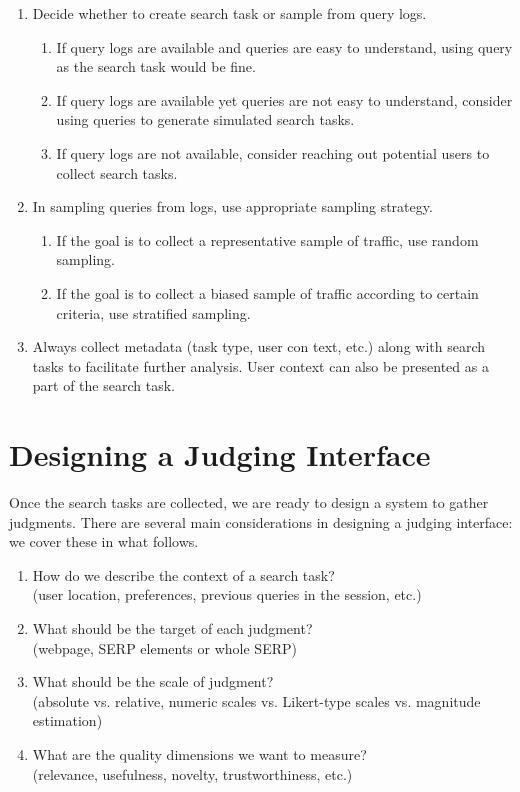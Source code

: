 \begin{enumerate}
	\item Decide whether to create search task or sample from query logs. 
	\begin{enumerate}
		\item If query logs are available and queries are easy to understand, using query as the search task would be fine. 
		\item If query logs are available yet queries are not easy to understand, consider using queries to generate simulated search tasks.
		\item If query logs are not available, consider reaching out potential users to collect search tasks.
	\end{enumerate}
	\item In sampling queries from logs, use appropriate sampling strategy. 
	\begin{enumerate}
		\item If the goal is to collect a representative sample of traffic, use random sampling.
		\item If the goal is to collect a biased sample of traffic according to certain criteria, use stratified sampling.
	\end{enumerate}
	\item Always collect metadata (task type, user con text, etc.) along with search tasks to facilitate further analysis. User context can also be presented as a part of the search task.
\end{enumerate}

\section{Designing a Judging Interface}

Once the search tasks are collected, we are ready to design a system to gather judgments. There are several main considerations in designing a judging interface: we cover these in what follows.

\begin{enumerate}
	\item  How do we describe the context of a search task? \\(user location, preferences, previous queries in the session, etc.)
	\item  What should be the target of each judgment? \\(webpage, SERP elements or whole SERP)
	\item  What should be the scale of judgment? \\(absolute vs. relative, numeric scales vs. Likert-type scales vs. magnitude estimation)	
	\item  What are the quality dimensions we want to measure? \\(relevance, usefulness, novelty, trustworthiness, etc.)
\end{enumerate}

